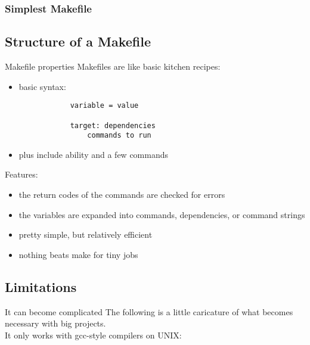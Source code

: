 \documentclass[xetex]{beamer}
\begin{document}

\begin{frame}[fragile]
	\scriptsize
	\frametitle{Simplest Makefile}
	
	
\end{frame}

\subsection{Structure of a Makefile}

\begin{frame}[fragile]{Makefile properties}
	Makefiles are like basic kitchen recipes:
	\begin{itemize}
		\item basic syntax:\\
		\begin{lstlisting}
			variable = value

			target: dependencies
				commands to run
		\end{lstlisting}
		\item plus include ability and a few commands
	\end{itemize}

	Features:
	\begin{itemize}
		\item the return codes of the commands are checked for errors
		\item the variables are expanded into commands, dependencies, or command strings
		\item pretty simple, but relatively efficient
		\item nothing beats make for tiny jobs
	\end{itemize}
\end{frame}



\subsection{Limitations}

\begin{frame}{It can become complicated}
	The following is a little caricature of what becomes necessary with big projects.\\
	It only works with gcc-style compilers on UNIX:
	
	
\end{frame}
\end{document}
